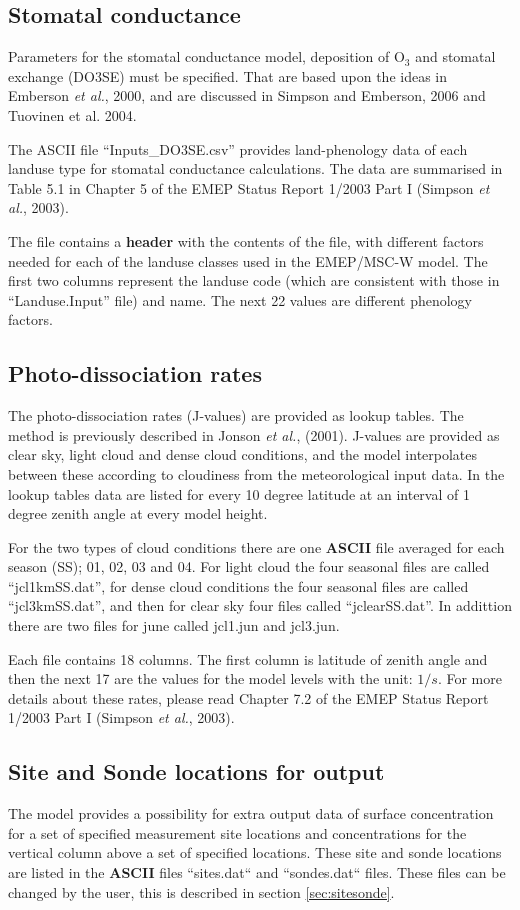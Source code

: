 \subsection{Stomatal conductance}
Parameters for the stomatal conductance model, deposition of O$_{3}$ and
stomatal exchange (DO3SE) must be specified. That are based upon the ideas in
Emberson {\sl et al.}, 2000, and are discussed in Simpson and Emberson,
2006 and Tuovinen et al. 2004.

The  ASCII file ``Inputs\_DO3SE.csv'' provides land-phenology data
of each landuse type for stomatal conductance calculations. The 
data are summarised in Table 5.1 in Chapter 5 of the EMEP 
Status Report 1/2003 Part I (Simpson {\sl et al.}, 2003).

The file contains a {\bf header} with the contents of the file,
with different factors needed for each of the landuse classes used
in the EMEP/MSC-W model. The first two columns represent the
landuse code (which are consistent with those in ``Landuse.Input'' file)
and name. The next 22 values are different phenology factors.


\subsection{Photo-dissociation rates}
The photo-dissociation rates (J-values) are provided as lookup
tables. The method is previously described in Jonson {\sl et
al.}, (2001). J-values are provided as clear sky, light cloud and dense
cloud conditions, and the model interpolates between these according
to cloudiness from the meteorological input data. In the lookup tables
data are listed for every 10 degree latitude at an interval of 1
degree zenith angle at every model height.

For the two types of cloud conditions there are one {\bf ASCII} file 
averaged for each season (SS); 01, 02, 03 and 04. 
For light cloud the four seasonal files are called ``jcl1kmSS.dat'', for dense cloud conditions
the four seasonal files are called ``jcl3kmSS.dat'', and then for clear sky four files 
called ``jclearSS.dat''. In addittion there are two files for june called jcl1.jun 
and jcl3.jun.

Each file contains 18 columns. The first column is latitude of zenith 
angle and then the
next 17 are the values for the model levels with the unit: $1/s$. 
For more details about these rates, please read Chapter 7.2 of the EMEP
Status Report 1/2003 Part I (Simpson {\sl et al.}, 2003).


\subsection{Site and Sonde locations for output}\label{sec:sitessondes_input}
The model provides a possibility for extra output data of surface concentration 
for a set of specified measurement site locations and concentrations for the vertical 
column above a set of specified locations. These site and sonde locations are listed 
in the {\bf ASCII} files ``sites.dat`` and ``sondes.dat`` files. These files can be 
changed by the user, this is described in section \ref{sec:sitesonde}.

